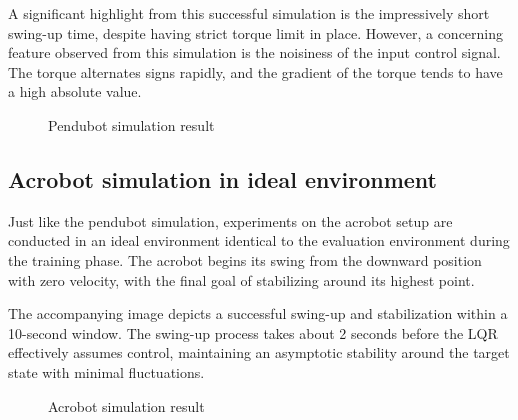 A significant highlight from this successful simulation is the impressively short swing-up time, despite having strict torque limit in place. However, a concerning feature observed from this simulation is the noisiness of the input control signal. The torque alternates signs rapidly, and the gradient of the torque tends to have a high absolute value.

\begin{figure}[H]
    \centering
    \caption{Pendubot simulation result}
    \label{fig:image_a}
\end{figure}

\subsection{Acrobot simulation in ideal environment}

Just like the pendubot simulation, experiments on the acrobot setup are conducted in an ideal environment identical to the evaluation environment during the training phase. The acrobot begins its swing from the downward position with zero velocity, with the final goal of stabilizing around its highest point.

The accompanying image depicts a successful swing-up and stabilization within a 10-second window. The swing-up process takes about 2 seconds before the LQR effectively assumes control, maintaining an asymptotic stability around the target state with minimal fluctuations.

\begin{figure}[H]
    \centering
    \caption{Acrobot simulation result}
    \label{fig:image_b}
\end{figure}

